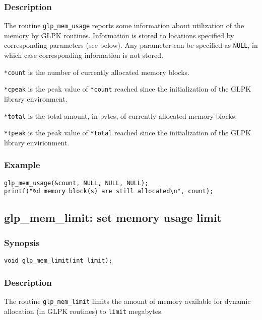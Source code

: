 \subsubsection*{Description}

The routine \verb|glp_mem_usage| reports some information about
utilization of the memory by GLPK routines. Information is stored to
locations specified by corresponding parameters (see below). Any
parameter can be specified as \verb|NULL|, in which case corresponding
information is not stored.

\verb|*count| is the number of currently allocated memory blocks.

\verb|*cpeak| is the peak value of \verb|*count| reached since the
initialization of the GLPK library environment.

\verb|*total| is the total amount, in bytes, of currently allocated
memory blocks.

\verb|*tpeak| is the peak value of \verb|*total| reached since the
initialization of the GLPK library envirionment.

\subsubsection*{Example}

\begin{verbatim}
glp_mem_usage(&count, NULL, NULL, NULL);
printf("%d memory block(s) are still allocated\n", count);
\end{verbatim}

\subsection{glp\_mem\_limit: set memory usage limit}

\subsubsection*{Synopsis}

\begin{verbatim}
void glp_mem_limit(int limit);
\end{verbatim}

\subsubsection*{Description}

The routine \verb|glp_mem_limit| limits the amount of memory available
for dynamic allocation (in GLPK routines) to \verb|limit| megabytes.


